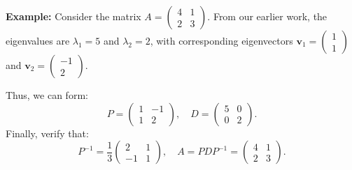 \documentclass[]{article}
\begin{document}
	\noindent \textbf{Example:}
	Consider the matrix $A = \begin{pmatrix} 4 & 1 \\ 2 & 3 \end{pmatrix}$.
	From our earlier work, the eigenvalues are $\lambda_1 = 5$ and $\lambda_2 = 2$, with corresponding eigenvectors $\mathbf{v}_1 = \begin{pmatrix} 1 \\ 1 \end{pmatrix}$ and $\mathbf{v}_2 = \begin{pmatrix} -1 \\ 2 \end{pmatrix}$.
	
	Thus, we can form:
	$$
	P = \begin{pmatrix} 1 & -1 \\ 1 & 2 \end{pmatrix},
	\quad D = \begin{pmatrix} 5 & 0 \\ 0 & 2 \end{pmatrix}.
	$$
	Finally, verify that:
	$$
	P^{-1} = \frac{1}{3} \begin{pmatrix} 2 & 1 \\ -1 & 1 \end{pmatrix},
	\quad A = PDP^{-1} = \begin{pmatrix} 4 & 1 \\ 2 & 3 \end{pmatrix}.
	$$
	
	
\end{document}
